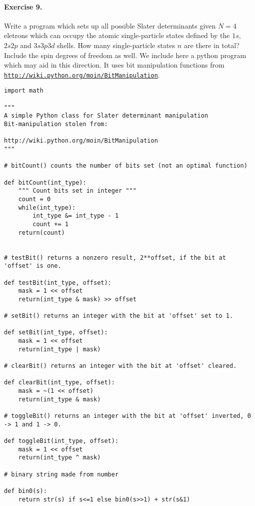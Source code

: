 \documentclass[%
twoside,                 %
final,                   %
10pt]{article}
\begin{document}
\paragraph{Exercise 9.}

Write a program which sets up all possible Slater determinants given $N=4$ eletrons which can occupy
the atomic single-particle states defined by the $1s$, $2s2p$ and $3s3p3d$ shells. How many single-particle
states $n$ are there in total?  Include the spin degrees of freedom as well.
We include here a python program which may aid in this direction. It uses bit manipulation functions from \href{{http://wiki.python.org/moin/BitManipulation}}{\nolinkurl{http://wiki.python.org/moin/BitManipulation}}.
\begin{verbatim}
import math

"""
A simple Python class for Slater determinant manipulation
Bit-manipulation stolen from:

http://wiki.python.org/moin/BitManipulation
"""

# bitCount() counts the number of bits set (not an optimal function)

def bitCount(int_type):
    """ Count bits set in integer """
    count = 0
    while(int_type):
        int_type &= int_type - 1
        count += 1
    return(count)


# testBit() returns a nonzero result, 2**offset, if the bit at 'offset' is one.

def testBit(int_type, offset):
    mask = 1 << offset
    return(int_type & mask) >> offset

# setBit() returns an integer with the bit at 'offset' set to 1.

def setBit(int_type, offset):
    mask = 1 << offset
    return(int_type | mask)

# clearBit() returns an integer with the bit at 'offset' cleared.

def clearBit(int_type, offset):
    mask = ~(1 << offset)
    return(int_type & mask)

# toggleBit() returns an integer with the bit at 'offset' inverted, 0 -> 1 and 1 -> 0.

def toggleBit(int_type, offset):
    mask = 1 << offset
    return(int_type ^ mask)

# binary string made from number

def bin0(s):
    return str(s) if s<=1 else bin0(s>>1) + str(s&1)


\end{verbatim}
\end{document}
